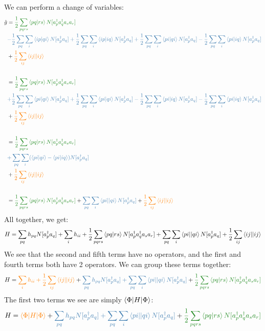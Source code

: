 \documentclass{article}
\newcommand{\dg}{\ensuremath{^\dagger} }
\def\cb#1{{\color{blue}#1}}
\def\co#1{{\color{orange}#1}}
\def\cg#1{{\color{green}#1}}
\begin{document}
We can perform a change of variables: 
\begin{align*}
\hat{g}&= \cg{\frac{1}{2} \sum_{pqrs} \braket{pq | rs} N[a_p\dg a_q\dg a_s a_r] } \\
& \cb{- \frac{1}{2} \sum_{pq} \sum_i \braket{ip | qi} N[ a_p\dg a_q] +  
\frac{1}{2} \sum_{pq} \sum_i \braket{ip | iq} N[ a_p\dg a_q ] + 
\frac{1}{2} \sum_{pq} \sum_i \braket{pi | qi} N[ a_p\dg a_q] -
\frac{1}{2} \sum_{pq} \sum_i \braket{pi | iq} N[ a_p\dg a_q] } \\
&+ \co{ \frac{1}{2} \sum_{ij} \braket{ij || ij} } \\ \\
&= \cg{\frac{1}{2} \sum_{pqrs} \braket{pq | rs} N[a_p\dg a_q\dg a_s a_r] } \\
& \cb{+ \frac{1}{2} \sum_{pq} \sum_i \braket{pi | qi} N[ a_p\dg a_q] +  
\frac{1}{2} \sum_{pq} \sum_i \braket{pi | qi} N[ a_p\dg a_q ] - 
\frac{1}{2} \sum_{pq} \sum_i \braket{pi | iq} N[ a_p\dg a_q] -
\frac{1}{2} \sum_{pq} \sum_i \braket{pi | iq} N[ a_p\dg a_q] } \\
&+ \co{ \frac{1}{2} \sum_{ij} \braket{ij || ij} }\\ \\
&= \cg{\frac{1}{2} \sum_{pqrs} \braket{pq | rs} N[a_p\dg a_q\dg a_s a_r] } \\
& \cb{+ \sum_{pq} \sum_i ( \braket{pi | qi} - \braket{pi | iq})  N[ a_p\dg a_q]} \\
&+ \co{ \frac{1}{2} \sum_{ij} \braket{ij || ij} } \\ \\
&=  \cg{\frac{1}{2} \sum_{pqrs} \braket{pq | rs} N[a_p\dg a_q\dg a_s a_r] } +  \cb{ \sum_{pq} \sum_i \braket{pi || qi}   N[ a_p\dg a_q]} + \co{ \frac{1}{2} \sum_{ij} \braket{ij || ij} } 
\end{align*}
All together, we get: 
\[H = \sum_{pq}h_{pq} N[a_p\dg a_q] + \sum_{i}h_{ii} + \frac{1}{2} \sum_{pqrs} \braket{pq | rs} N[a_p\dg a_q\dg a_s a_r]  +   \sum_{pq} \sum_i \braket{pi || qi}   N[ a_p\dg a_q] +  \frac{1}{2} \sum_{ij} \braket{ij || ij}  \]
We see that the second and fifth terms have no operators, and
the first and fourth terms both have 2 operators.
We can group these terms together: 
\[H = \co{ \sum_{i}h_{ii} + \frac{1}{2} \sum_{ij} \braket{ij || ij}}  + \cb{\sum_{pq}h_{pq} N[a_p\dg a_q]  +   \sum_{pq} \sum_i \braket{pi || qi}   N[ a_p\dg a_q]}
  + \cg{\frac{1}{2} \sum_{pqrs} \braket{pq | rs} N[a_p\dg a_q\dg a_s a_r]}  \]
  The first two terms we see are simply $\braket{\Phi |H|\Phi}$: 
 \[H = \co{ \braket{\Phi |H|\Phi}} + \cb{\sum_{pq}h_{pq} N[a_p\dg a_q]  +   \sum_{pq} \sum_i \braket{pi || qi}   N[ a_p\dg a_q]}
  + \cg{\frac{1}{2} \sum_{pqrs} \braket{pq | rs} N[a_p\dg a_q\dg a_s a_r]}  \]
\end{document}
